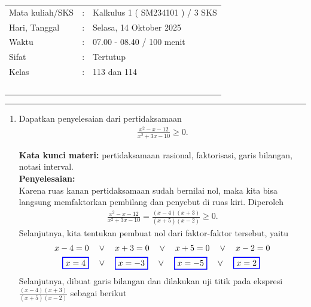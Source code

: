 \documentclass[10pt,openany,a4paper]{article}
\theoremstyle{definition}
\theoremstyle{definition}
\theoremstyle{plain}
\newenvironment{jawab}[2][tes]{%
\par\noindent\textbf{Kata kunci materi:} #1.\\
\textbf{Penyelesaian:} #2%
}{}
\begin{document}
    \begin{center}
	\begin{tabular}{lcl}
		Mata kuliah/SKS & : & Kalkulus 1 ( SM234101 ) / 3 SKS\\
		Hari, Tanggal & : & Selasa, 14 Oktober 2025\\
		Waktu & : & 07.00 - 08.40 / 100 menit\\
		Sifat & : & Tertutup\\
		Kelas & : & 113 dan 114\\
  ~
	\end{tabular}

    \noindent\rule{\textwidth}{2.pt}
        \end{center}
        \begin{enumerate}
            \item Dapatkan penyelesaian dari pertidaksamaan
            \begin{align*}
                \frac{x^2-x-12}{x^2+3x-10}\geq 0.
            \end{align*}
            \begin{jawab}[pertidaksamaan rasional, faktorisasi, garis bilangan, notasi interval]{~\\
                Karena ruas kanan pertidaksamaan sudah bernilai nol, maka kita bisa langsung memfaktorkan pembilang dan penyebut di ruas kiri. Diperoleh
                \begin{align*}
                    \frac{x^2-x-12}{x^2+3x-10} = \frac{(x-4)(x+3)}{(x+5)(x-2)} \geq 0.
                \end{align*}
                Selanjutnya, kita tentukan pembuat nol dari faktor-faktor tersebut, yaitu
                \begin{align*}
                    x-4 = 0 \quad &\vee\quad x+3 = 0 \quad \vee\quad x+5 = 0 \quad \vee\quad x-2 = 0\\
                    \colorlet{oldcolor}{.}
        \color{blue}
        \setlength{\fboxrule}{1pt} \boxed{\color{oldcolor}x=4}\color{oldcolor} \quad &\vee\quad \colorlet{oldcolor}{.}
        \color{blue}
        \setlength{\fboxrule}{1pt} \boxed{\color{oldcolor}x=-3}\color{oldcolor} \quad \vee\quad \colorlet{oldcolor}{.}
        \color{blue}
        \setlength{\fboxrule}{1pt} \boxed{\color{oldcolor}x=-5}\color{oldcolor} \quad \vee\quad \colorlet{oldcolor}{.}
        \color{blue}
        \setlength{\fboxrule}{1pt} \boxed{\color{oldcolor}x=2}\color{oldcolor}
                \end{align*}
                Selanjutnya, dibuat garis bilangan dan dilakukan uji titik pada ekspresi \(\frac{(x-4)(x+3)}{(x+5)(x-2)}\) sebagai berikut
}
\end{jawab}
\end{enumerate}
\end{document}
